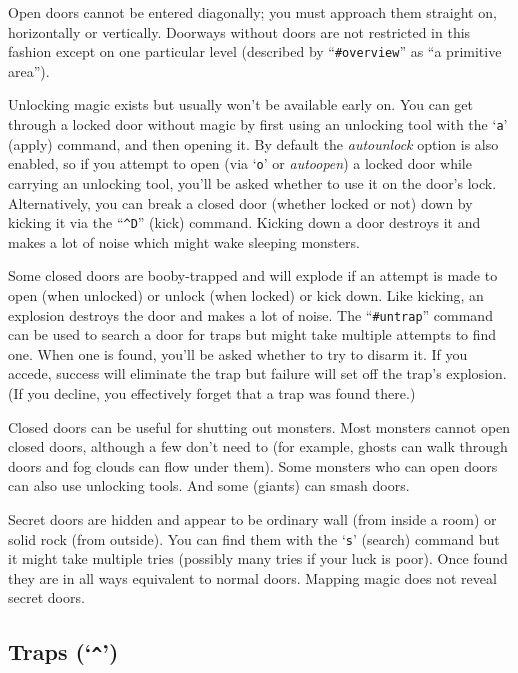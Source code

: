 \documentclass[titlepage]{article}
\begin{document}
Open doors cannot be entered diagonally; you must approach them
straight on, horizontally or vertically.
Doorways without doors are
not restricted in this fashion except on one particular level
(described by ``\texttt{\#overview}'' as ``a primitive area'').

Unlocking magic exists but usually won't be available early on.
You can get through a locked door without magic by first using an
unlocking tool with the `\texttt{a}' (apply) command, and then opening it.
By default the
\textit{autounlock}
option is also enabled, so if you attempt to open (via `\texttt{o}' or
\textit{autoopen})
a locked door while carrying an unlocking tool, you'll be asked whether
to use it on the door's lock.
Alternatively, you can break a closed door (whether locked or not) down
by kicking it via the ``\texttt{\textasciicircum D}'' (kick) command.
Kicking down a door destroys it and makes a lot of noise which might
wake sleeping monsters.

Some closed doors are booby-trapped and will explode if an attempt is made
to open (when unlocked) or unlock (when locked) or kick down.
Like kicking, an explosion destroys the door and makes a lot of noise.
The ``\texttt{\#untrap}'' command can be used to search a door for traps but
might take multiple attempts to find one.
When one is found, you'll be asked whether to try to disarm it.
If you accede, success will eliminate the trap but
failure will set off the trap's explosion.
(If you decline, you effectively forget that a trap was found there.)

Closed doors can be useful for shutting out monsters.
Most monsters cannot open closed doors, although a few don't need to
(for example, ghosts can walk through doors and fog clouds can flow
under them).
Some monsters who can open doors can also use unlocking tools.
And some (giants) can smash doors.

Secret doors are hidden and appear to be ordinary wall (from inside a
room) or solid rock (from outside).
You can find them with the `\texttt{s}' (search) command but it might
take multiple tries (possibly many tries if your luck is poor).
Once found they are in all ways equivalent to normal doors.
Mapping magic does not reveal secret doors.

\subsection*{Traps (`\texttt{\textasciicircum }')}
\end{document}
